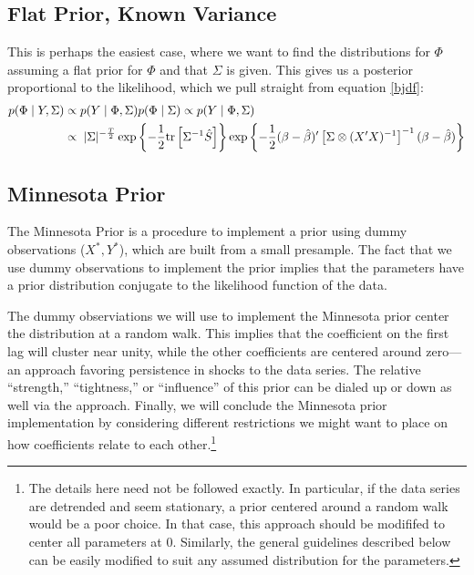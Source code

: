 \documentclass[a4paper,12pt]{scrartcl}
\begin{document}
\subsection{Flat Prior, Known Variance}

This is perhaps the easiest case, where we want to find
the distributions for $\Phi$ assuming a flat prior for
$\Phi$ and that $\Sigma$ is given. This gives us
a posterior proportional to the likelihood, which we
pull straight from equation \ref{bjdf}:
\begin{align*}
    p(\Phi \; | \; Y, \Sigma) &\propto p( Y \; | \; \Phi, \Sigma)
	p(\Phi \; | \; \Sigma) \propto p(Y \; |\; \Phi, \Sigma) \\
    &\propto 	
	\;|\Sigma|^{-\frac{T}{2}} 
	\exp\left\{ -\frac{1}{2} \text{tr} \left[\Sigma^{-1}
	\hat{S} \right] \right\} \notag 
	\exp\left\{ -\frac{1}{2} 
	(\beta - \hat{\beta})'
	\left[\Sigma \otimes (X'X)^{-1}\right]^{-1} 
	(\beta - \hat{\beta}) 
	\right\} \notag
\end{align*}

\subsection{Minnesota Prior}

The Minnesota Prior is a procedure to implement a prior
using dummy observations ($X^*, Y^*$), which 
are built from a small presample.  The fact that we
use dummy observations to implement the prior implies
that the parameters have a prior distribution
conjugate to the likelihood function of the data.

The dummy observiations we will use to implement the
Minnesota prior center the distribution at a random walk.
This implies that the coefficient on the first lag will 
cluster near unity, while the other coefficients are 
centered around
zero---an approach favoring persistence in shocks to the 
data series. The relative ``strength,'' ``tightness,'' or
``influence'' of this prior can be dialed up or down as well
via the approach.
Finally, we will conclude the Minnesota prior implementation
by considering different restrictions we might want to place
on how coefficients relate to each other.\footnote{The 
details here need not be followed exactly.  In particular,
if the data series are detrended and seem stationary, a
prior centered around a random walk would be a poor choice.
In that case, this approach should be modififed to center
all parameters at 0.  Similarly, the general guidelines
described below can be easily modified to suit any assumed
distribution for the parameters.}
\end{document}
